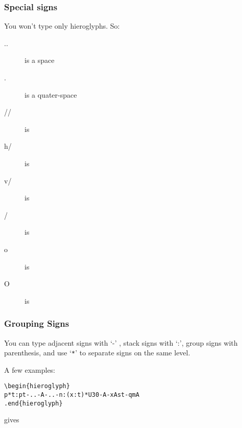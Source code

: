\documentclass[final]{article}
\begin{document}
\subsubsection{Special signs}
You won't type only hieroglyphs. So: 
\begin{description}
\item[..] is a space
\item[.] is a quater-space
\item[//] is 
  \begin{hieroglyph}{\leavevmode \hachureg }\end{hieroglyph}

\item[h/] is 
  \begin{hieroglyph}{\leavevmode \hachureh }\end{hieroglyph}

\item[v/] is 
  \begin{hieroglyph}{\leavevmode \hachurev }\end{hieroglyph}

\item[/] is 
  \begin{hieroglyph}{\leavevmode \hachuret }\end{hieroglyph}


\item[o] is 
  \begin{hieroglyph}{\leavevmode \pointrouge}\end{hieroglyph}

\item[O] is 
  \begin{hieroglyph}{\leavevmode \pointnoir}\end{hieroglyph}

\end{description}

\subsubsection{Grouping Signs}

You can type adjacent signs with `-' , stack signs with `:', group
signs with parenthesis, and use `\verb.*.' to separate signs on the
same level. 

A few examples: 
\begin{flushleft}
  \verb.\.\verb/begin{hieroglyph}/\\
  \verb/p*t:pt-..-A-..-n:(x:t)*U30-A-xAst-qmA/\\
  \verb/./\verb/end{hieroglyph}/\\
\end{flushleft}
gives 
\begin{hieroglyph}{\leavevmode {}\HinterSignsSpace
\HfullSpace \HinterSignsSpace
{}\HinterSignsSpace
\HfullSpace \HinterSignsSpace
{}\HinterSignsSpace
{}\HinterSignsSpace
{}\HinterSignsSpace
{}}\end{hieroglyph}
\end{document}
